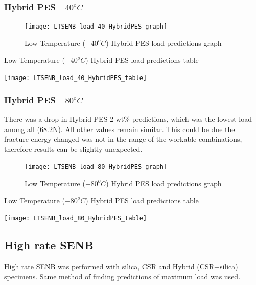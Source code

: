 \documentclass[numbers=noendperiod,chapterprefix=on]{icldt} %
\begin{document}
{ \subsubsection{\space Hybrid PES $ -40 ^{o}C$}
 
 \begin{figure}[!hp]
   \centering
   \texttt{[image: LTSENB\_load\_40\_HybridPES\_graph]}\label{LTSENB_load_40_HybridPES_graph}
   \caption{Low Temperature ($ -40 ^{o}C$) Hybrid PES load predictions graph}
   \end{figure}
  \FloatBarrier
  
  \begin{table}
     \centering
     \caption{Low Temperature ($ -40 ^{o}C$) Hybrid PES load predictions table}\label{LTSENB_load_40_HybridPES_table}
     \texttt{[image: LTSENB\_load\_40\_HybridPES\_table]}
     \end{table}
     \FloatBarrier

\subsubsection{\space Hybrid PES $ -80 ^{o}C$}
 There was a drop in Hybrid PES 2 wt\% predictions, which was the lowest load among all (68.2N). All other values remain similar. This could be due the fracture energy changed was not in the range of the workable combinations, therefore results can be slightly unexpected.
 
 \begin{figure}[!hp]
   \centering
   \texttt{[image: LTSENB\_load\_80\_HybridPES\_graph]}\label{LTSENB_load_80_HybridPES_graph}
   \caption{Low Temperature ($ -80 ^{o}C$) Hybrid PES load predictions graph}
   \end{figure}
  \FloatBarrier
  
  \begin{table}
     \centering
     \caption{Low Temperature ($ -80 ^{o}C$) Hybrid PES load predictions table}\label{LTSENB_load_80_HybridPES_table}
     \texttt{[image: LTSENB\_load\_80\_HybridPES\_table]}
     \end{table}
     \FloatBarrier      



      
\subsection{High rate SENB}
High rate SENB was performed with silica, CSR and Hybrid (CSR+silica) specimens. Same method of finding predictions of maximum load was used.




}
\end{document}
